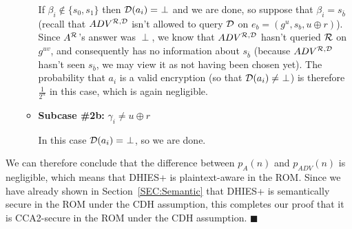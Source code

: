 \begin{itemize}
\begin{itemize}
If $\beta_i \notin \{s_0,s_1\}$ then $\mathcal{D}(a_i) = \ \perp$ and we are done,
so suppose that $\beta_i = s_{\bar{b}}$ (recall that $ADV^{\mathcal{R},\mathcal{D}}$ isn't
allowed to query $\mathcal{D}$ on $e_b = (g^u, s_b, u\oplus r)$).  Since $A^{\mathcal{R}}$'s
answer was $\perp$, we know that $ADV^{\mathcal{R},\mathcal{D}}$ hasn't queried $\mathcal{R}$ on
$g^{uv}$, and consequently has no information about $s_{\bar{b}}$ (because
$ADV^{\mathcal{R},\mathcal{D}}$ hasn't seen $s_{\bar{b}}$, we may view it as not
having been chosen yet). The probability that $a_i$ is a valid encryption (so
that $\mathcal{D}(a_i) \neq \ \perp$) is therefore $\frac{1}{2^n}$ in this case,
which is again negligible.  \item {\bf Subcase \#2b:} $\gamma_i \neq u \oplus
r$

In this case $\mathcal{D}(a_i) = \ \perp$, so we are done.
\end{itemize}

\end{itemize}
We can therefore conclude that the difference between $p_A(n)$ and
$p_{ADV}(n)$ is negligible, which means that DHIES+ is plaintext-aware in the
ROM. Since we have already shown in Section~\ref{SEC:Semantic} that DHIES+ is
semantically secure in the ROM under the CDH assumption, this completes our
proof that it is CCA2-secure in the ROM under the CDH assumption.
$\blacksquare$
